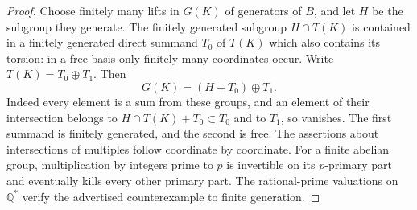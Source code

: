 \begin{proof}
Choose finitely many lifts in $G(K)$ of generators of $B$, and let $H$
be the subgroup they generate. The finitely generated subgroup
$H\cap T(K)$ is contained in a finitely generated direct summand $T_0$
of $T(K)$ which also contains its torsion: in a free basis only finitely
many coordinates occur. Write $T(K)=T_0\oplus T_1$. Then
\[
 G(K)=(H+T_0)\oplus T_1.
\]
Indeed every element is a sum from these groups, and an element of their
intersection belongs to $H\cap T(K)+T_0\subset T_0$ and to $T_1$, so
vanishes. The first summand is finitely generated, and the second is
free. The assertions about intersections of multiples follow coordinate
by coordinate. For a finite abelian group, multiplication by integers
prime to $p$ is invertible on its $p$-primary part and eventually kills
every other primary part. The rational-prime valuations on $\mathbb Q^*$
verify the advertised counterexample to finite generation.
\end{proof}

